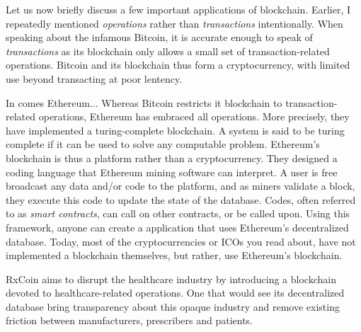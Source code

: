 Let us now briefly discuss a few important applications of blockchain.
Earlier, I repeatedly mentioned \emph{operations} rather than \emph{transactions} intentionally.
When speaking about the infamous Bitcoin, it is accurate enough to speak of \emph{transactions} as its blockchain
only allows a small set of transaction-related operations.
Bitcoin and its blockchain thus form a cryptocurrency, with limited use beyond transacting at poor lentency.

In comes Ethereum...
Whereas Bitcoin restricts it blockchain to transaction-related operations, Ethereum has embraced all operations.
More precisely, they have implemented a turing-complete blockchain.
A system is said to be turing complete if it can be used to solve any computable problem.
Ethereum's blockchain is thus a platform rather than a cryptocurrency.
They designed a coding language that Ethereum mining software can interpret. 
A user is free broadcast any data and/or code to the platform, and as miners validate a block,
they execute this code to update the state of the database.
Codes, often referred to as \emph{smart contracts}, can call on other contracts, or be called upon.
Using this framework, anyone can create a application that uses Ethereum's decentralized database.
Today, most of the cryptocurrencies or ICOs you read about, have not implemented a blockchain themselves,
but rather, use Ethereum's blockchain.

RxCoin aims to disrupt the healthcare industry by introducing a blockchain devoted to healthcare-related operations.
One that would see its decentralized database bring transparency about this opaque industry
and remove existing friction between manufacturers, prescribers and patients. 
